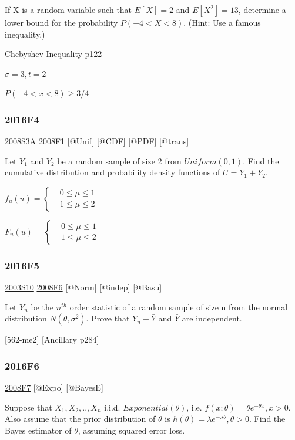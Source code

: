\documentclass[6pt,twocolumn,Portrait]{article}
\begin{document}
If X is a random variable such that \(E[X]=2\) and \(E[X^2]=13\),
determine a lower bound for the probability \(P(-4<X<8)\). (Hint: Use a
famous inequality.)

Chebyshev Inequality p122

\(\sigma=3, t=2\)

\(P(-4<x<8)\ge3/4\)

\hypertarget{f4-6}{%
\subsubsection{2016F4}\label{f4-6}}

\protect\hyperlink{s3a}{2008S3A} \protect\hyperlink{f1-3}{2008F1}
{[}@Unif{]} {[}@CDF{]} {[}@PDF{]} {[}@trans{]}

Let \(Y_1\) and \(Y_2\) be a random sample of size 2 from
\(Uniform(0,1)\). Find the cumulative distribution and probability
density functions of \(U=Y_1+Y_2\).

\(f_u(u)=\begin{cases}&0\le\mu\le1\\&1\le\mu\le2\end{cases}\)

\(F_u(u)=\begin{cases}&0\le\mu\le1\\&1\le\mu\le2\end{cases}\)

\hypertarget{f5-6}{%
\subsubsection{2016F5}\label{f5-6}}

\protect\hyperlink{s10}{2003S10} \protect\hyperlink{f6-3}{2008F6}
{[}@Norm{]} {[}@indep{]} {[}@Basu{]}

Let \(Y_n\) be the \(n^{th}\) order statistic of a random sample of size
n from the normal distribution \(N(\theta,\sigma^2)\). Prove that
\(Y_n-\bar Y\) and \(\bar Y\) are independent.

{[}562-me2{]} {[}Ancillary p284{]}

\hypertarget{f6-5}{%
\subsubsection{2016F6}\label{f6-5}}

\protect\hyperlink{f7-3}{2008F7} {[}@Expo{]} {[}@BayesE{]}

Suppose that \(X_1,X_2,..,X_n\) i.i.d. \(Exponential(\theta)\), i.e.
\(f(x;\theta)=\theta e^{-\theta x},x>0\). Also assume that the prior
distribution of \(\theta\) is
\(h(\theta)=\lambda e^{-\lambda\theta},\theta>0\). Find the Bayes
estimator of \(\theta\), assuming squared error loss.
\end{document}
